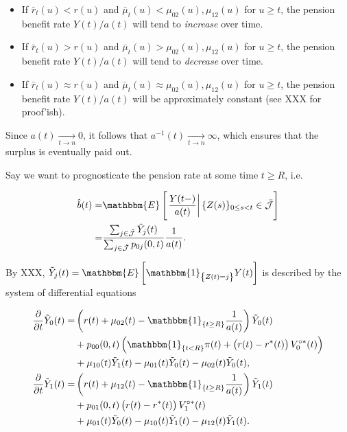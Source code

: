 \documentclass{book}
\newcommand{\1}[1]{\mathbbm{1}_{\left\lbrace #1 \right\rbrace}}
\newcommand{\expec}[1][def]{\mathbbm{E} \left[ #1 \right]}
\newcommand{\econd}[2][def]{\mathbbm{E} \left[ \left. #1 \right| #2 \right]}
\theoremstyle{break}
\theoremstyle{remark}
\numberwithin{equation}{section}
\begin{document}
\begin{itemize}
	\item If $\bar{r}_t(u)<r(u)$ and $\bar{\mu}_t(u)<\mu_{02}(u),\mu_{12}(u)$ for $u \geq t$, the pension benefit rate $Y(t)/a(t)$ will tend to \textit{increase} over time.
	\item If $\bar{r}_t(u)>r(u)$ and $\bar{\mu}_t(u)>\mu_{02}(u),\mu_{12}(u)$ for $u \geq t$, the pension benefit rate $Y(t)/a(t)$ will tend to \textit{decrease} over time.
	\item If $\bar{r}_t(u)\approx r(u)$ and $\bar{\mu}_t(u)\approx \mu_{02}(u),\mu_{12}(u)$ for $u \geq t$, the pension benefit rate $Y(t)/a(t)$ will be approximately constant (see XXX for proof'ish).
\end{itemize}

Since $a(t) \underset{t \to n}{\longrightarrow} 0$, it follows that $a^{-1}(t) \underset{t \to n}{\longrightarrow} \infty$, which ensures that the surplus is eventually paid out.

Say we want to prognosticate the pension rate at some time $t \geq R$, i.e.

\begin{align*}
	\hat{b}(t) =& \econd[\frac{Y(t-)}{a(t)}]{\{Z(s) \}_{0 \leq s < t} \in \bar{\mathcal{J}}} \\
	=&\frac{\sum_{j \in \hat{\mathcal{J}}} \tilde{Y}_j(t)}{\sum_{j \in \hat{\mathcal{J}}} p_{0j}(0,t)} \frac{1}{a(t)}.
\end{align*}

By XXX, $\tilde{Y}_j(t) = \expec[\1{Z(t)=j} Y(t)]$ is described by the system of differential equations

\begin{align*}
	\frac{\partial}{\partial t} \tilde{Y}_0(t) =& \left( r(t) + \mu_{02}(t) - \1{t \geq R} \frac{1}{a(t)}\right) \tilde{Y}_0(t) \\
	&+ p_{00}(0,t) \left( \1{t<R} \pi(t) + \left( r(t) - r^*(t) \right) V_{0}^{\circ*}(t) \right) \\
	&+ \mu_{10}(t) \tilde{Y}_1(t) - \mu_{01}(t) \tilde{Y}_0(t) - \mu_{02}(t) \tilde{Y}_0(t), \\
	\frac{\partial}{\partial t} \tilde{Y}_1(t) =& \left( r(t) + \mu_{12}(t) - \1{t \geq R} \frac{1}{a(t)}\right) \tilde{Y}_1(t) \\
	&+ p_{01}(0,t) \left( r(t) - r^*(t) \right) V_{1}^{\circ*}(t) \\
	&+ \mu_{01}(t) \tilde{Y}_0(t) - \mu_{10}(t) \tilde{Y}_1(t) - \mu_{12}(t) \tilde{Y}_1(t).
\end{align*}
\end{document}
